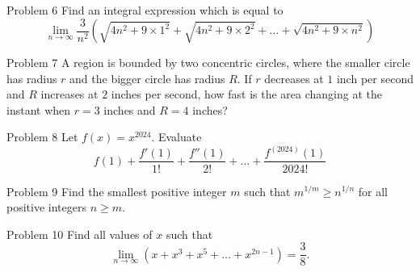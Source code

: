 \documentclass{beamer}
\begin{document}
\begin{frame}{Problem 6}
Find an integral expression which is equal to
{\small
$$\lim_{n\rightarrow\infty}\frac{3}{n^2}\left(\sqrt{4n^2 + 9\times 1^2} + \sqrt{4n^2 + 9\times 2^2} + \dots + \sqrt{4n^2 + 9\times n^2}\right)$$
}
\end{frame}

\begin{frame}{Problem 7}
A region is bounded by two concentric circles, where the smaller circle has radius $r$ and the bigger circle has radius $R$.
If $r$ decreases at $1$ inch per second and $R$ increases at $2$ inches per second, how fast is the area changing at the instant when $r=3$ inches and $R=4$ inches?
\end{frame}

\begin{frame}{Problem 8}
Let $f(x) = x^{2024}$.  Evaluate
$$f(1) + \frac{f'(1)}{1!} + \frac{f''(1)}{2!} + \dots + \frac{f^{(2024)}(1)}{2024!}$$
\end{frame}

\begin{frame}{Problem 9}
Find the smallest positive integer $m$ such that $m^{1/m} \geq n^{1/n}$ for all positive integers $n\geq m$.
\end{frame}

\begin{frame}{Problem 10}
Find all values of $x$ such that
$$\lim_{n\rightarrow\infty} (x + x^3 + x^5 + \dots + x^{2n-1}) = \frac{3}{8}.$$
\end{frame}
\end{document}
